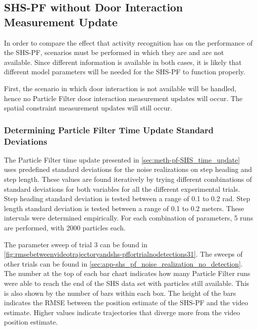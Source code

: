 \subsection{SHS-PF without Door Interaction Measurement Update}
\label{sec:SHS-PF_without_door_interaction}
In order to compare the effect that activity recognition has on the performance of the SHS-PF, scenarios must be performed in which they are and are not available. Since different information is available in both cases, it is likely that different model parameters will be needed for the SHS-PF to function properly.\par 

First, the scenario in which door interaction is not available will be handled, hence no Particle Filter door interaction measurement updates will occur. The spatial constraint measurement updates will still occur.

\subsubsection{Determining Particle Filter Time Update Standard Deviations}

The Particle Filter time update presented in \cref{sec:meth-pf-SHS_time_update} uses predefined standard deviations for the noise realizations on step heading and step length. These values are found iteratively by trying different combinations of standard deviations for both variables for all the different experimental trials. Step heading standard deviation is tested between a range of 0.1 to 0.2 rad. Step length standard deviation is tested between a range of 0.1 to 0.2 meters. These intervals were determined empirically. For each combination of parameters, 5 runs are performed, with 2000 particles each.\par 

The parameter sweep of trial 3 can be found in \cref{fig:rmsebetweenvideotrajectoryandshs-pffortrialnodetections31}. The sweeps of other trials can be found in \cref{sec:app-shs_pf_noise_realization_no_detection}. The number at the top of each bar chart indicates how many Particle Filter runs were able to reach the end of the SHS data set with particles still available. This is also shown by the number of bars within each box. The height of the bars indicates the RMSE between the position estimate of the SHS-PF and the video estimate. Higher values indicate trajectories that diverge more from the video position estimate.\par 

